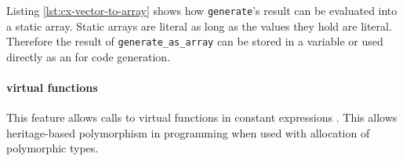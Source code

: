 \documentclass[../main]{subfiles}
\begin{document}
Listing \ref{lst:cx-vector-to-array} shows how \lstinline{generate}'s result
can be evaluated into a static array. Static arrays are literal as long
as the values they hold are literal. Therefore the result of
\lstinline{generate_as_array} can be stored in a \constexpr variable or used
directly as an \nttp for code generation.

\paragraph{
  \constexpr virtual functions
}

This feature allows calls to virtual functions in constant expressions
\cite{virtual-constexpr}. This allows heritage-based polymorphism in \constexpr
programming when used with \constexpr allocation of polymorphic types.

%
%


%
\end{document}
